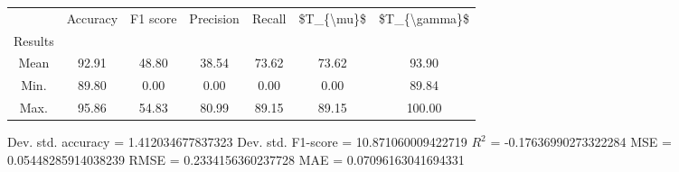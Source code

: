 \begin{tabular}{|c|c|c|c|c|c|c|}
\toprule
{} &  Accuracy &  F1 score &  Precision &  Recall &  \$T\_\{\textbackslash mu\}\$ &  \$T\_\{\textbackslash gamma\}\$ \\
Results &           &           &            &         &            &               \\
\hline
Mean    &     92.91 &     48.80 &      38.54 &   73.62 &      73.62 &         93.90 \\
Min.    &     89.80 &      0.00 &       0.00 &    0.00 &       0.00 &         89.84 \\
Max.    &     95.86 &     54.83 &      80.99 &   89.15 &      89.15 &        100.00 \\
\bottomrule
\end{tabular}

 Dev. std. accuracy = 1.412034677837323
 Dev. std. F1-score = 10.871060009422719
 $R^2$ = -0.17636990273322284
 MSE = 0.05448285914038239
 RMSE = 0.2334156360237728
 MAE = 0.07096163041694331